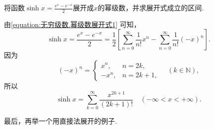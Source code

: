 \begin{example}
将函数\(\sinh x = \frac{e^x - e^{-x}}{2}\)展开成\(x\)的幂级数，并求展开式成立的区间.
\begin{solution}
由\cref{equation:无穷级数.幂级数展开式1} 可知，\[
	\sinh x
	= \frac{e^x - e^{-x}}{2}
	= \frac{1}{2} \left[
	\sum_{n=0}^\infty \frac{1}{n!} x^n
	- \sum_{n=0}^\infty \frac{1}{n!} (-x)^n
	\right].
\]
因为\[
	(-x)^n = \left\{ \begin{array}{cl}
		x^n, & n=2k, \\
		-x^n, & n=2k+1,
	\end{array} \right.
	\quad(k\in\mathbb{N}),
\]
所以\[
	\sinh x
	= \sum_{k=0}^\infty \frac{x^{2k+1}}{(2k+1)!}
	\quad(-\infty<x<+\infty).
\]
\end{solution}
\end{example}

最后，再举一个用直接法展开的例子.

